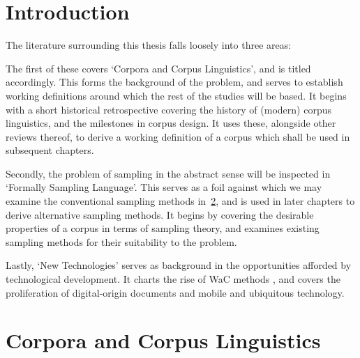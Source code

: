 \section{Introduction}
The literature surrounding this thesis falls loosely into three areas:  

The first of these covers `Corpora and Corpus Linguistics', and is titled accordingly.  This forms the background of the problem, and serves to establish working definitions around which the rest of the studies will be based.  It begins with a short historical retrospective covering the history of (modern) corpus linguistics, and the milestones in corpus design.  It uses these, alongside other reviews thereof, to derive a working definition of a corpus which shall be used in subsequent chapters.

Secondly, the problem of sampling in the abstract sense will be inspected in `Formally Sampling Language'.  This serves as a foil against which we may examine the conventional sampling methods in~\ref{sec:litreview-corpora}, and is used in later chapters  to derive alternative sampling methods.    It begins by covering the desirable properties of a corpus in terms of sampling theory, and examines existing sampling methods for their suitability to the problem.


Lastly, `New Technologies' serves as background in the opportunities afforded by technological development.  It charts the rise of WaC methods , and covers the proliferation of digital-origin documents and mobile and ubiquitous technology.




\section{Corpora and Corpus Linguistics}
\label{sec:litreview-corpora}




